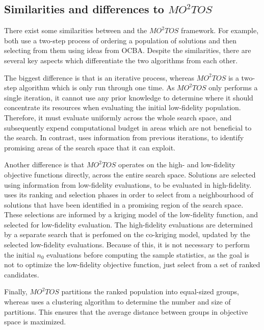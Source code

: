 \subsection{Similarities and differences to $MO^2TOS$}
There exist some similarities between \AlgName{} and the $MO^2TOS$ framework. For example, both use a two-step process of ordering a population of solutions and then selecting from them using ideas from OCBA. Despite the similarities, there are several key aspects which differentiate the two algorithms from each other. 

The biggest difference is that \AlgName{} is an iterative process, whereas $MO^2TOS$ is a two-step algorithm which is only run through one time. As $MO^2TOS$ only performs a single iteration, it cannot use any prior knowledge to determine where it should concentrate its resources when evaluating the initial low-fidelity population. Therefore, it must evaluate uniformly across the whole search space, and subsequently expend computational budget in areas which are not beneficial to the search. In contrast, \AlgName{} uses information from previous iterations, to identify promising areas of the search space that it can exploit.

Another difference is that $MO^2TOS$ operates on the high- and low-fidelity objective functions directly, across the entire search space. Solutions are selected using information from low-fidelity evaluations, to be evaluated in high-fidelity. \AlgName{} uses its ranking and selection phases in order to select from a neighbourhood of solutions that have been identified in a promising region of the search space. These selections are informed by a kriging model of the low-fidelity function, and selected for low-fidelity evaluation. The high-fidelity evaluations are determined by a separate search that is perfomed on the co-kriging model, updated by the selected low-fidelity evaluations. Because of this, it is not necessary to perform the initial $n_0$ evaluations before computing the sample statistics, as the goal is not to optimize the low-fidelity objective function, just select from a set of ranked candidates.

Finally, $MO^2TOS$ partitions the ranked population into equal-sized groups, whereas \AlgName{} uses a clustering algorithm to determine the number and size of partitions. This ensures that the average distance between groups in objective space is maximized.

